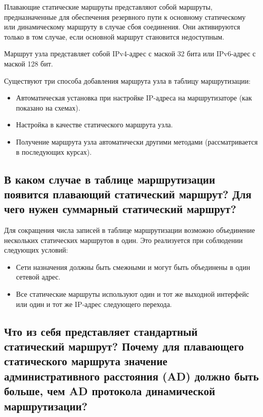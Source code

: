 Плавающие статические маршруты представляют собой маршруты,
предназначенные для обеспечения резервного пути к основному статическому
или динамическому маршруту в случае сбоя соединения.
Они активируются только в том случае,
если основной маршрут становится недоступным.\par
Маршрут узла представляет собой IPv4-адрес с маской 32 бита
или IPv6-адрес с маской 128 бит.\par
Существуют три способа добавления маршрута узла в таблицу маршрутизации:

\begin{itemize}
	\item Автоматическая установка при настройке IP-адреса
		на маршрутизаторе (как показано на схемах).
	\item Настройка в качестве статического маршрута узла.
	\item Получение маршрута узла автоматически другими методами
		(рассматривается в последующих курсах).
\end{itemize}

\subsection{В каком случае в таблице маршрутизации появится
	плавающий статический маршрут?
	Для чего нужен суммарный статический маршрут?}

Для сокращения числа записей в таблице маршрутизации возможно
объединение нескольких статических маршрутов в один.
Это реализуется при соблюдении следующих условий:

\begin{itemize}
	\item Сети назначения должны быть смежными и могут быть объединены
		в один сетевой адрес.
	\item Все статические маршруты используют один
		и тот же выходной интерфейс или один
		и тот же IP-адрес следующего перехода.
\end{itemize}

\subsection{Что из себя представляет стандартный статический маршрут?
	Почему для плавающего статического маршрута значение
	административного расстояния (AD) должно быть больше,
	чем AD протокола динамической маршрутизации?}

